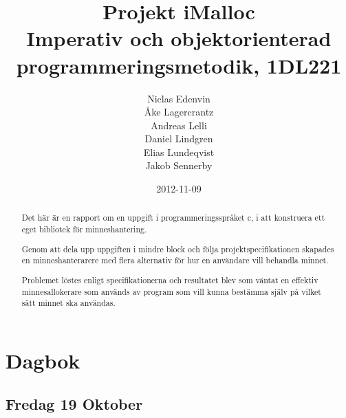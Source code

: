 \documentclass{article}
\title{
  Projekt iMalloc \\
  Imperativ och objektorienterad programmeringsmetodik, 1DL221
}
\author{
  Niclas Edenvin \\
  Åke Lagercrantz \\
  Andreas Lelli \\
  Daniel Lindgren \\
  Elias Lundeqvist \\
  Jakob Sennerby
}
\date{2012-11-09}
\begin{document}
\maketitle

\vspace{4cm}

\begin{abstract}
  \centering
  \begin{minipage}{0.75\textwidth}
  { 
  \parskip5pt

  \noindent Det här är en rapport om en uppgift i programmeringsspråket c, i att konstruera ett eget bibliotek för minneshantering.

  \noindent Genom att dela upp uppgiften i mindre block och följa projektspecifikationen skapades en minneshanterarere med flera alternativ för hur en användare vill behandla minnet.

  \noindent Problemet löstes enligt specifikationerna och resultatet blev som väntat en effektiv minnesallokerare som används av program som vill kunna bestämma själv på vilket sätt minnet ska användas.
  }

  \end{minipage}


\end{abstract}


\newpage

\tableofcontents

\newpage





\section{Dagbok}

\subsection{Fredag 19 Oktober}
\end{document}

